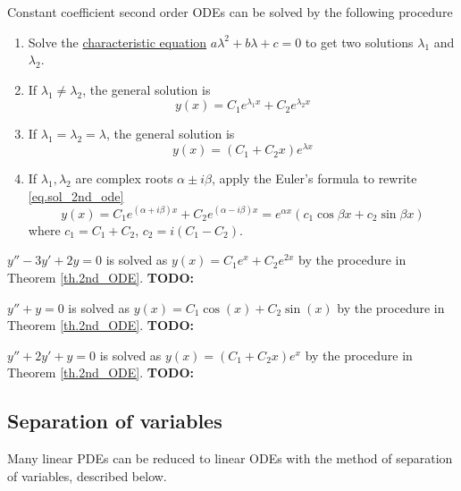\begin{theorem}[]\label{th.2nd_ODE}
    Constant coefficient second order ODEs can be solved by the following procedure
    \begin{enumerate}
        \item Solve the \underline{characteristic equation} $a\lambda^2 +  b\lambda + c = 0$ to get two solutions $\lambda_1$ and $\lambda_2$.
        \item If $\lambda_1\neq\lambda_2$, the general solution is 
        \begin{equation}\label{eq.sol_2nd_ode}
            y(x)=C_1 e^{\lambda_1 x}+C_2 e^{\lambda_2 x}
        \end{equation}
        \item If $\lambda_1=\lambda_2=\lambda$, the general solution is 
        \begin{equation}\label{eq.sol_2nd_ode_eqroot}
            y(x)=(C_1 + C_2x) e^{\lambda x}
        \end{equation}
        \item If $\lambda_1, \lambda_2$ are complex roots $\alpha \pm i\beta$, apply the Euler's formula to rewrite \eqref{eq.sol_2nd_ode}
        \begin{equation*}
            y(x)=C_1 e^{(\alpha+i \beta) x}+C_2 e^{(\alpha-i \beta) x}=e^{\alpha x}\left(c_1 \cos \beta x+c_2 \sin \beta x\right)
        \end{equation*}
        where $c_1=C_1+C_2$, $c_2=i(C_1-C_2)$.
    \end{enumerate}
\end{theorem}

\begin{example}[]
    $y'' - 3y' + 2y = 0$ is solved as $y(x)=C_1e^{x}+C_2e^{2x}$ by the procedure in Theorem \ref{th.2nd_ODE}.
    \textbf{TODO: }
\end{example}

\begin{example}[]
    $y'' + y = 0$ is solved as $y(x)=C_1\cos(x)+C_2\sin(x)$ by the procedure in Theorem \ref{th.2nd_ODE}.
    \textbf{TODO: }
\end{example}

\begin{example}[]
    $y'' + 2y' + y = 0$ is solved as $y(x)=(C_1+C_2x)e^x$ by the procedure in Theorem \ref{th.2nd_ODE}.
    \textbf{TODO: }
\end{example}

\subsection{Separation of variables}
Many linear PDEs can be reduced to linear ODEs with the method of separation of
variables, described below.

